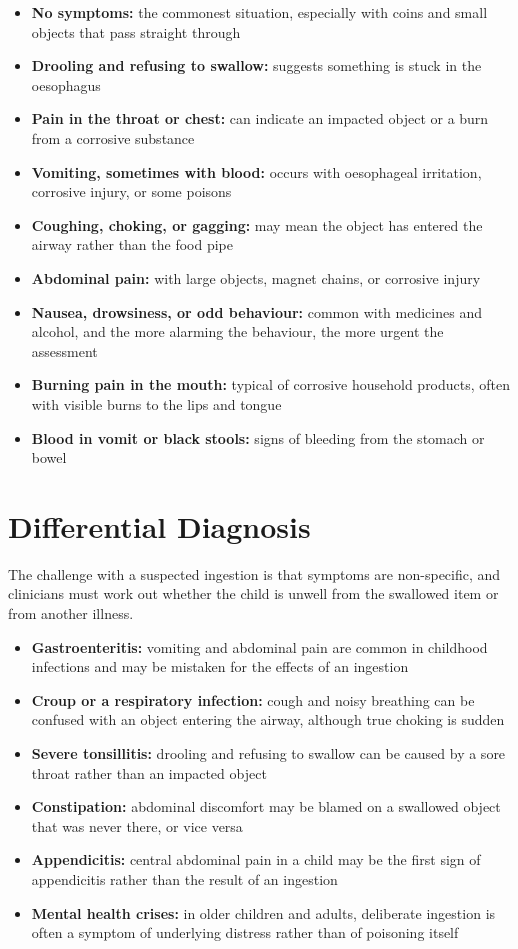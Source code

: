 \begin{itemize}
    \item \textbf{No symptoms:} the commonest situation, especially with coins and small objects that pass straight through
    \item \textbf{Drooling and refusing to swallow:} suggests something is stuck in the oesophagus
    \item \textbf{Pain in the throat or chest:} can indicate an impacted object or a burn from a corrosive substance
    \item \textbf{Vomiting, sometimes with blood:} occurs with oesophageal irritation, corrosive injury, or some poisons
    \item \textbf{Coughing, choking, or gagging:} may mean the object has entered the airway rather than the food pipe
    \item \textbf{Abdominal pain:} with large objects, magnet chains, or corrosive injury
    \item \textbf{Nausea, drowsiness, or odd behaviour:} common with medicines and alcohol, and the more alarming the behaviour, the more urgent the assessment
    \item \textbf{Burning pain in the mouth:} typical of corrosive household products, often with visible burns to the lips and tongue
    \item \textbf{Blood in vomit or black stools:} signs of bleeding from the stomach or bowel
\end{itemize}

\section*{Differential Diagnosis}
The challenge with a suspected ingestion is that symptoms are non-specific, and clinicians must work out whether the child is unwell from the swallowed item or from another illness.

\begin{itemize}
    \item \textbf{Gastroenteritis:} vomiting and abdominal pain are common in childhood infections and may be mistaken for the effects of an ingestion
    \item \textbf{Croup or a respiratory infection:} cough and noisy breathing can be confused with an object entering the airway, although true choking is sudden
    \item \textbf{Severe tonsillitis:} drooling and refusing to swallow can be caused by a sore throat rather than an impacted object
    \item \textbf{Constipation:} abdominal discomfort may be blamed on a swallowed object that was never there, or vice versa
    \item \textbf{Appendicitis:} central abdominal pain in a child may be the first sign of appendicitis rather than the result of an ingestion
    \item \textbf{Mental health crises:} in older children and adults, deliberate ingestion is often a symptom of underlying distress rather than of poisoning itself
\end{itemize}

